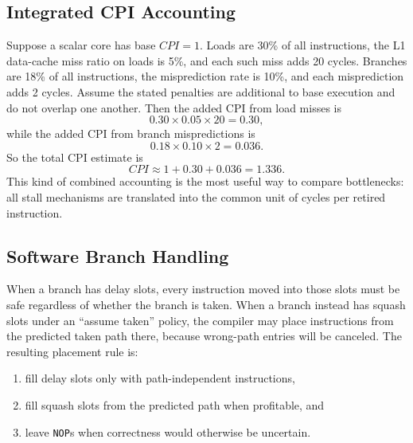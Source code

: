 \subsection*{Integrated CPI Accounting}\label{subsec:auto-013b}
Suppose a scalar core has base $CPI=1$.
Loads are 30\% of all instructions, the L1 data-cache miss ratio on loads is 5\%, and each such miss adds 20 cycles.
Branches are 18\% of all instructions, the misprediction rate is 10\%, and each misprediction adds 2 cycles.
Assume the stated penalties are additional to base execution and do not overlap one another.
Then the added CPI from load misses is
\begin{equation}\label{eq:auto-048a}
    0.30\times 0.05\times 20 = 0.30,
\end{equation}
while the added CPI from branch mispredictions is
\begin{equation}\label{eq:auto-048b}
    0.18\times 0.10\times 2 = 0.036.
\end{equation}
So the total CPI estimate is
\begin{equation}\label{eq:auto-048c}
    CPI \approx 1 + 0.30 + 0.036 = 1.336.
\end{equation}
This kind of combined accounting is the most useful way to compare bottlenecks: all stall mechanisms are translated into the common unit of cycles per retired instruction.

\subsection*{Software Branch Handling}\label{subsec:auto-013a}
When a branch has delay slots, every instruction moved into those slots must be safe regardless of whether the branch is taken.
When a branch instead has squash slots under an ``assume taken'' policy, the compiler may place instructions from the predicted taken path there, because wrong-path entries will be canceled.
The resulting placement rule is:
\begin{enumerate}
    \item fill delay slots only with path-independent instructions,
    \item fill squash slots from the predicted path when profitable, and
    \item leave \texttt{NOP}s when correctness would otherwise be uncertain.
\end{enumerate}


